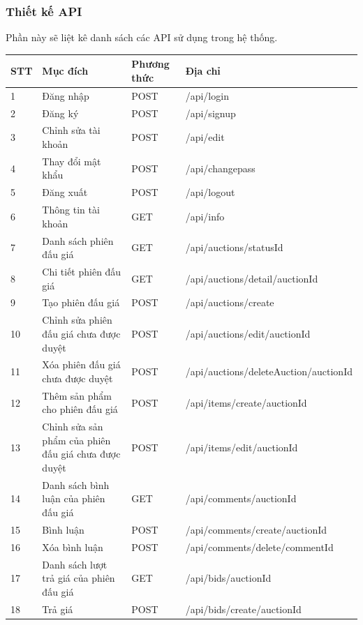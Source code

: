 \documentclass{article}
\begin{document}
\subsubsection{Thiết kế API}
Phần này sẽ liệt kê danh sách các API sử dụng trong hệ thống.
    \begin{longtable}{| p{} | p{} | p{} | p{} |} 
    \hline
        \bfseries STT & \bfseries Mục đích & \bfseries Phương thức & \bfseries Địa chỉ  \\\hline
        1 & Đăng nhập & POST & /api/login\\\hline
        2 & Đăng ký & POST & /api/signup\\\hline
        3 & Chỉnh sửa tài khoản & POST & /api/edit\\\hline
        4 & Thay đổi mật khẩu & POST & /api/changepass\\\hline
        5 & Đăng xuất & POST & /api/logout\\\hline
        6 & Thông tin tài khoản & GET & /api/info\\\hline
        7 & Danh sách phiên đấu giá & GET & /api/auctions/{statusId}\\\hline
        8 & Chi tiết phiên đấu giá & GET & /api/auctions/detail/{auctionId}\\\hline
        9 & Tạo phiên đấu giá & POST & /api/auctions/create\\\hline
        10 & Chỉnh sửa phiên đấu giá chưa được duyệt & POST & /api/auctions/edit/{auctionId}\\\hline
        11 & Xóa phiên đấu giá chưa được duyệt & POST & /api/auctions/deleteAuction/{auctionId}\\\hline
        12 & Thêm sản phẩm cho phiên đấu giá & POST & /api/items/create/{auctionId}\\\hline
        13 & Chỉnh sửa sản phẩm của phiên đấu giá chưa được duyệt & POST & /api/items/edit/{auctionId}\\\hline
        14 & Danh sách bình luận của phiên đấu giá & GET & /api/comments/{auctionId}\\\hline
        15 & Bình luận & POST & /api/comments/create/{auctionId}\\\hline
        16 & Xóa bình luận & POST & /api/comments/delete/{commentId}\\\hline
        17 & Danh sách lượt trả giá của phiên đấu giá & GET & /api/bids/{auctionId}\\\hline
        18 & Trả giá & POST & /api/bids/create/{auctionId}\\\hline

\end{longtable}
\end{document}
